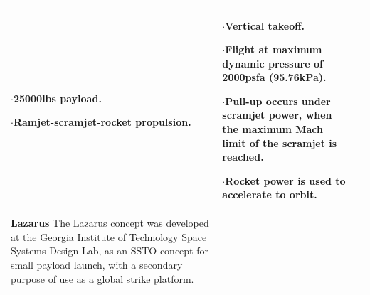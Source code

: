 \begin{xltabular}{\linewidth}{|X|X|X|}
$\cdot$25000lbs payload.

$\cdot$Ramjet-scramjet-rocket propulsion. 
 
&
\small {}

$\cdot$Vertical takeoff. 

$\cdot$Flight at maximum dynamic pressure of 2000psfa (95.76kPa). 

$\cdot$Pull-up occurs under scramjet power, when the maximum Mach limit of the scramjet is reached. 

$\cdot$Rocket power is used to accelerate to orbit. 
 \\
\hline \small\textbf{Lazarus}\cite{Young2006} \newline \newline 
The Lazarus concept was developed at the Georgia Institute of Technology Space Systems Design Lab, as an SSTO concept for small payload launch, with a secondary purpose of use as a global strike platform. 

&\small {}  


\end{xltabular}
